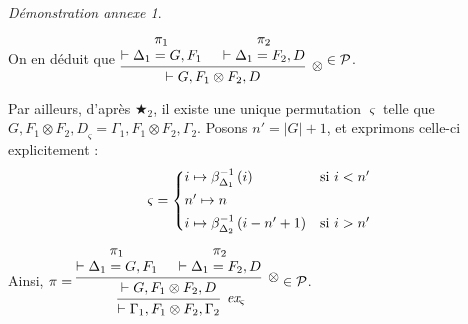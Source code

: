 \documentclass[11pt,a4paper]{article}
\theoremstyle{plain}
\theoremstyle{definition}
\theoremstyle{remark}
\newtheorem{demonstrationappendix}{Démonstration annexe}
\newcommand*{\tensor}{\otimes}
\newcommand*{\namedproofv}[2]{\hypo{#1}\infer[no rule]{1}{\vdash #2}}
\newcommand*{\tensorv}[1]{\infer{2}[\ensuremath{\tensor}]{\vdash #1}}
\newcommand*{\permv}[2]{\infer{1}[\ensuremath{\textit{ex}_{#1}}]{\vdash #2}}
\newcommand*{\someperm}{\varsigma}
\newcommand*{\sequent}{\Gamma}
\newcommand*{\sequentbis}{\Delta}
\newcommand*{\proofs}{\ensuremath{\mathcal{P}}}
\begin{document}
\begin{demonstrationappendix}
\begin{description}
        On en déduit que 
        $\begin{prooftree}
            \namedproofv{\pi_1}{\sequentbis_1 = G, F_1}
            \namedproofv{\pi_2}{\sequentbis_1 = F_2, D}
            \tensorv{G, F_1 \tensor F_2, D}
        \end{prooftree} 
        \in \proofs$. 
    
        Par ailleurs, d'après $\bigstar_2$, il existe une unique permutation $\someperm$ telle que ${G, F_1 \tensor F_2, D}_\someperm = \sequent_1, F_1 \tensor F_2, \sequent_2$. Posons $n' = | G | + 1$, et exprimons celle-ci explicitement :
        \begin{equation*}
            \someperm = 
            \begin{cases*}
                i \mapsto \beta_{\sequentbis_1}^{-1} \left( i \right) & si $i < n' $\\
                n' \mapsto n \\
                i \mapsto \beta_{\sequentbis_2}^{-1} \left( i - n' + 1 \right) & si $i > n' $\\
            \end{cases*}
        \end{equation*}
    
        Ainsi, $\pi =
        \begin{prooftree}
            \namedproofv{\pi_1}{\sequentbis_1 = G, F_1}
            \namedproofv{\pi_2}{\sequentbis_1 = F_2, D}
            \tensorv{G, F_1 \tensor F_2, D}
            \permv{\someperm}{\sequent_1, F_1 \tensor F_2, \sequent_2}
        \end{prooftree} 
        \in \proofs$. 
    

\end{description}
\end{demonstrationappendix}
\end{document}
